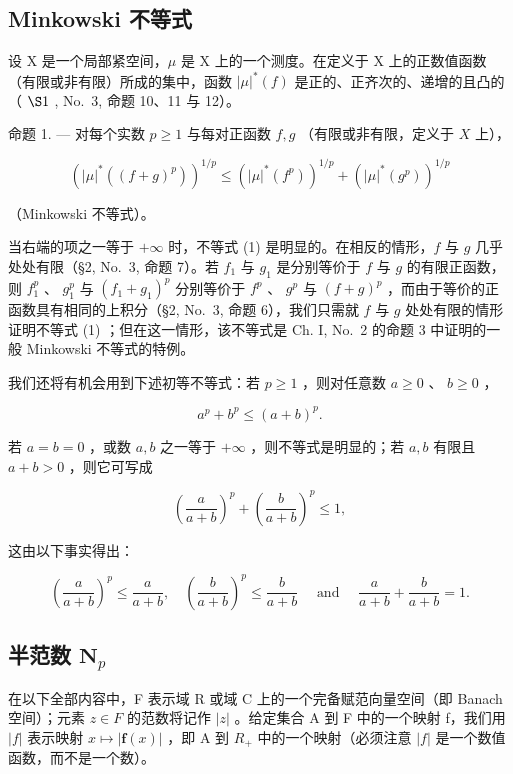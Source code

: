 \subsection{Minkowski 不等式}

设 X 是一个局部紧空间，\(\mu\) 是 X 上的一个测度。在定义于 X 上的正数值函数（有限或非有限）所成的集中，函数 \(|\mu|^{*}(f)\) 是正的、正齐次的、递增的且凸的（ \(\S1\) , No.~3, 命题 10、11 与 12）。

命题 1. --- 对每个实数 \(p \geqslant 1\) 与每对正函数 \(f, g\) （有限或非有限，定义于 \(X\) 上），

\[
\left(| \mu | ^ {*} ((f + g) ^ {p})\right) ^ {1 / p} \leqslant \left(| \mu | ^ {*} (f ^ {p})\right) ^ {1 / p} + \left(| \mu | ^ {*} (g ^ {p})\right) ^ {1 / p}\tag{1}
\]

（Minkowski 不等式）。

当右端的项之一等于 \(+\infty\) 时，不等式 (1) 是明显的。在相反的情形，\(f\) 与 \(g\) 几乎处处有限（§2, No.~3, 命题 7）。若 \(f_1\) 与 \(g_1\) 是分别等价于 \(f\) 与 \(g\) 的有限正函数，则 \(f_1^p\) 、 \(g_1^p\) 与 \((f_1 + g_1)^p\) 分别等价于 \(f^p\) 、 \(g^p\) 与 \((f + g)^p\) ，而由于等价的正函数具有相同的上积分（§2, No.~3, 命题 6），我们只需就 \(f\) 与 \(g\) 处处有限的情形证明不等式 (1) ；但在这一情形，该不等式是 Ch. I, No.~2 的命题 3 中证明的一般 Minkowski 不等式的特例。

我们还将有机会用到下述初等不等式：若 \(p \geqslant 1\) ，则对任意数 \(a \geqslant 0\) 、 \(b \geqslant 0\) ，

\[
a ^ {p} + b ^ {p} \leqslant (a + b) ^ {p}.\tag{2}
\]

若 \(a = b = 0\) ，或数 \(a, b\) 之一等于 \(+\infty\) ，则不等式是明显的；若 \(a, b\) 有限且 \(a + b > 0\) ，则它可写成

\[
\left(\frac {a}{a + b}\right) ^ {p} + \left(\frac {b}{a + b}\right) ^ {p} \leqslant 1,
\]

这由以下事实得出：

\[
\left(\frac {a}{a + b}\right) ^ {p} \leqslant \frac {a}{a + b}, \quad \left(\frac {b}{a + b}\right) ^ {p} \leqslant \frac {b}{a + b} \quad \text { and } \quad \frac {a}{a + b} + \frac {b}{a + b} = 1.
\]

\subsection{\texorpdfstring{半范数 \(\mathbf{N}_p\)}{半范数 N sub p}}

在以下全部内容中，F 表示域 R 或域 C 上的一个完备赋范向量空间（即 Banach 空间）；元素 \(z \in F\) 的范数将记作 \(|z|\) 。给定集合 A 到 F 中的一个映射 f，我们用 \(|f|\) 表示映射 \(x \mapsto |\mathbf{f}(x)|\) ，即 A 到 \(R_{+}\) 中的一个映射（必须注意 \(|f|\) 是一个数值函数，而不是一个数）。

